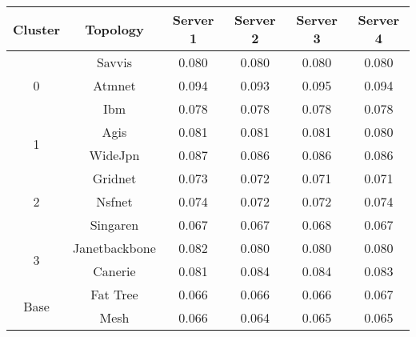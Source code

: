 \begin{tabular}{cccccc}
\toprule
Cluster & Topology & Server 1 & Server 2 & Server 3 & Server 4 \\
\midrule
\multirow{3}{*}{0}& Savvis & 0.080 & 0.080 & 0.080 & 0.080 \\
& Atmnet & 0.094 & 0.093 & 0.095 & 0.094 \\
& Ibm & 0.078 & 0.078 & 0.078 & 0.078 \\ \hline
\multirow{2}{*}{1}& Agis & 0.081 & 0.081 & 0.081 & 0.080 \\
& WideJpn & 0.087 & 0.086 & 0.086 & 0.086 \\ \hline
\multirow{3}{*}{2}& Gridnet & 0.073 & 0.072 & 0.071 & 0.071 \\
& Nsfnet & 0.074 & 0.072 & 0.072 & 0.074 \\
& Singaren & 0.067 & 0.067 & 0.068 & 0.067 \\ \hline
\multirow{2}{*}{3}& Janetbackbone & 0.082 & 0.080 & 0.080 & 0.080 \\
& Canerie & 0.081 & 0.084 & 0.084 & 0.083 \\ \hline
\multirow{2}{*}{Base}& Fat Tree & 0.066 & 0.066 & 0.066 & 0.067 \\
& Mesh & 0.066 & 0.064 & 0.065 & 0.065 \\
\bottomrule
\end{tabular}
